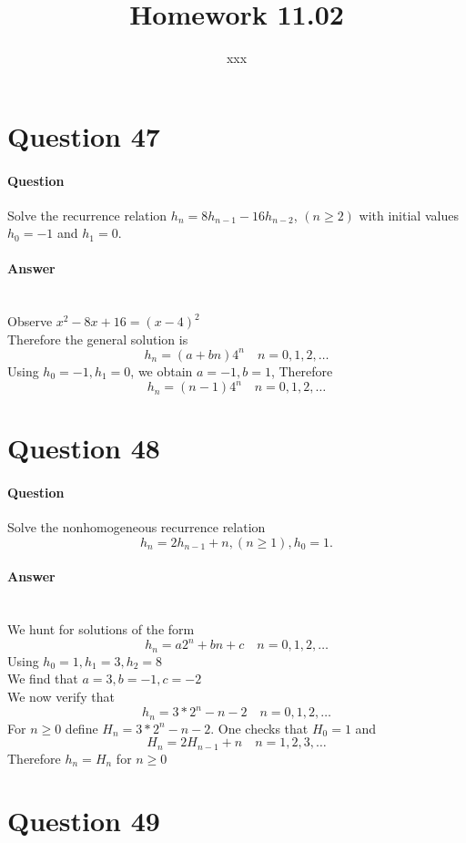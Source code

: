 \documentclass[UTF8]{article}
\title{Homework 11.02}
\author{xxx}
\date{}
\begin{document}
\maketitle
\section{Question 47}
\paragraph{Question}
Solve the recurrence relation $ h_{n} = 8h_{n - 1} - 16h_{n - 2} $, $ (n \geq 2) $ with initial values $ h_{0} = -1 $ and $ h_{1} = 0 $.
\paragraph{Answer}
    ~\\
    Observe $ x^{2} - 8x + 16 = (x - 4)^{2} $ \\
    Therefore the general solution is
    $$ h_{n} = (a + bn)4^{n} \quad n = 0,1,2,\dots $$
    Using $ h_{0} = -1,h_{1} = 0 $, we obtain $ a = -1 , b = 1 $, Therefore
    $$ h_{n} = (n - 1)4^{n} \quad n = 0,1,2,\dots $$



\section{Question 48}
\paragraph{Question}
Solve the nonhomogeneous recurrence relation
$$ h_{n} = 2h_{n-1} + n , (n \geq 1) , h_{0} = 1.$$
\paragraph{Answer}
~\\
We hunt for solutions of the form
$$ h_{n} = a2^{n} + bn +c \quad n = 0,1,2,\dots $$
Using $ h_{0} = 1, h_{1} = 3, h_{2} = 8 $ \\
We find that $ a = 3, b = -1, c = -2 $ \\
We now verify that
$$ h_{n} = 3 * 2^{n} -n - 2 \quad n = 0,1,2, \dots $$
For $ n \geq 0 $ define $ H_{n} = 3 * 2^{n} - n - 2 $. One checks that $ H_{0} = 1 $ and
$$ H_{n} = 2H_{n - 1} + n \quad n = 1,2,3, \dots $$
Therefore $ h_{n} = H_{n} $ for $ n \geq 0 $
\section{Question 49}
\end{document}
